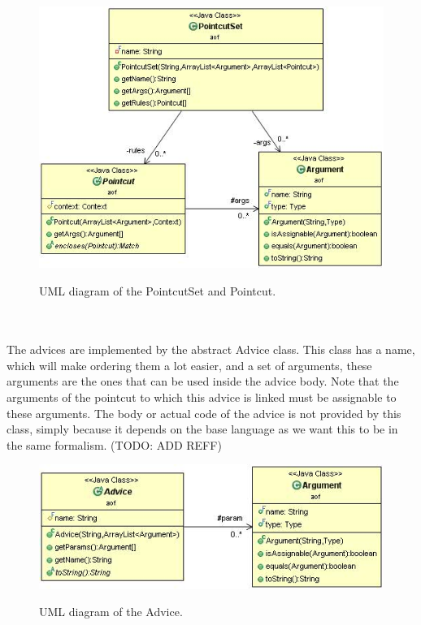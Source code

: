 \documentclass[a4paper]{report}
\begin{document}
\begin{figure}[h!]
\centering
\includegraphics[scale=0.7]{images/AOF/PointcutSet.jpg}
\label{fig:PointcutSet}
\caption{UML diagram of the PointcutSet and Pointcut.}
\end{figure}\\
\\
The advices are implemented by the abstract Advice class. This class has a name, which will make ordering them a lot easier, and a set of arguments, these arguments are the ones that can be used inside the advice body. Note that the arguments of the pointcut to which this advice is linked must be assignable to these arguments. The body or actual code of the advice is not provided by this class, simply because it depends on the base language as we want this to be in the same formalism. (TODO: ADD REFF)
\begin{figure}[h!]
\centering
\includegraphics[scale=0.7]{images/AOF/Advice.jpg}
\label{fig:Advice}
\caption{UML diagram of the Advice.}
\end{figure}\\
\\
\end{document}
